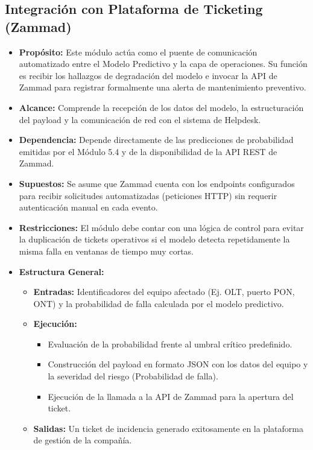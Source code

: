 \documentclass[12pt,a4paper]{article}
\begin{document}
    \subsection{Integración con Plataforma de Ticketing (Zammad)}
    \label{subsec:zammad}
    \begin{itemize}
        \item \textbf{Propósito:} Este módulo actúa como el puente de comunicación automatizado entre el Modelo Predictivo y la capa de operaciones. Su función es recibir los hallazgos de degradación del modelo e invocar la API de Zammad para registrar formalmente una alerta de mantenimiento preventivo.
        \item \textbf{Alcance:} Comprende la recepción de los datos del modelo, la estructuración del payload y la comunicación de red con el sistema de Helpdesk.
        \item \textbf{Dependencia:} Depende directamente de las predicciones de probabilidad emitidas por el Módulo 5.4 y de la disponibilidad de la API REST de Zammad.
        \item \textbf{Supuestos:} Se asume que Zammad cuenta con los endpoints configurados para recibir solicitudes automatizadas (peticiones HTTP) sin requerir autenticación manual en cada evento.
        \item \textbf{Restricciones:} El módulo debe contar con una lógica de control para evitar la duplicación de tickets operativos si el modelo detecta repetidamente la misma falla en ventanas de tiempo muy cortas.
        \item \textbf{Estructura General:} 
        \begin{itemize}
            \item \textbf{Entradas:} Identificadores del equipo afectado (Ej. OLT, puerto PON, ONT) y la probabilidad de falla calculada por el modelo predictivo.
            \item \textbf{Ejecución: } 
            \begin{itemize}
                \item Evaluación de la probabilidad frente al umbral crítico predefinido.
                \item Construcción del payload en formato JSON con los datos del equipo y la severidad del riesgo (Probabilidad de falla).
                \item Ejecución de la llamada a la API de Zammad para la apertura del ticket.
            \end{itemize} 
            \item \textbf{Salidas:} Un ticket de incidencia generado exitosamente en la plataforma de gestión de la compañía.
        \end{itemize}
    \end{itemize}
\end{document}
